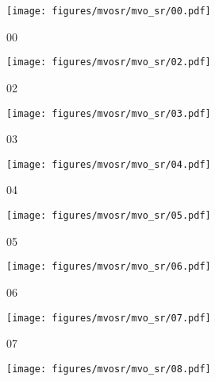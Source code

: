 \begin{figure}
    \centering
    \begin{subfigure}[b]{0.18\textwidth}
    \texttt{[image: figures/mvosr/mvo\_sr/00.pdf]}

    \caption{00}
    \vspace*{2mm}

    \label{fig:mvo_path_00}
    \end{subfigure}
    \begin{subfigure}[b]{0.18\textwidth}
        \texttt{[image: figures/mvosr/mvo\_sr/02.pdf]}

        \caption{02}
        \label{fig:mvo_path_02}
        \vspace*{2mm}
     \end{subfigure}
    \begin{subfigure}[b]{0.18\textwidth}
            \texttt{[image: figures/mvosr/mvo\_sr/03.pdf]}

        \caption{03}
        \label{fig:mvo_path_03}
        \vspace*{2mm}
    \end{subfigure}
    \begin{subfigure}[b]{0.18\textwidth}
        \texttt{[image: figures/mvosr/mvo\_sr/04.pdf]}

    \caption{04}
    \label{fig:mvo_path_04}
    \vspace*{2mm}
    \end{subfigure}
    \begin{subfigure}[b]{0.18\textwidth}
        \texttt{[image: figures/mvosr/mvo\_sr/05.pdf]}

    \caption{05}
    \label{fig:mvo_path_05}
    \vspace*{2mm}
    \end{subfigure}
    \begin{subfigure}[b]{0.18\textwidth}
        \texttt{[image: figures/mvosr/mvo\_sr/06.pdf]}

    \caption{06}
    \label{fig:mvo_path_06}
    \vspace*{2mm}
    \end{subfigure}
    \begin{subfigure}[b]{0.18\textwidth}
        \texttt{[image: figures/mvosr/mvo\_sr/07.pdf]}

    \caption{07}
    \label{fig:mvo_path_07}
    \vspace*{2mm}
    \end{subfigure}
    \begin{subfigure}[b]{0.18\textwidth}
        \texttt{[image: figures/mvosr/mvo\_sr/08.pdf]}


\end{subfigure}
\end{figure}
